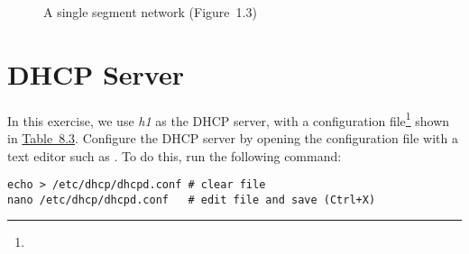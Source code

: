 \documentclass{../UTNetLab}
\begin{document}
\begin{center}
    \begin{minipage}{0.48\textwidth}
        \begin{flushright}
            \begin{figure}[H]
                \centering
                \caption{A single segment network (Figure~1.3)}
                \label{fig:1.3}
            \end{figure}
        \end{flushright}
    \end{minipage}
\end{center}

\section{DHCP Server}
In this exercise, we use \textit{h1} as the DHCP server, with a configuration file\footnote{} shown in \hyperref[tab:8.3]{Table~8.3}.
Configure the DHCP server by opening the configuration file with a text editor such as .
To do this, run the following command:

\begin{lstlisting}
echo > /etc/dhcp/dhcpd.conf # clear file
nano /etc/dhcp/dhcpd.conf   # edit file and save (Ctrl+X)
\end{lstlisting}
\end{document}
